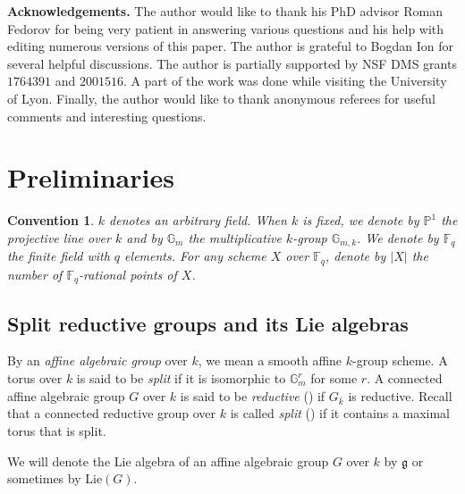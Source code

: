 \documentclass{amsart}
\newcommand{\gm}{\mathbb{G}_{m}}
\theoremstyle{plain}
\newtheorem{convention}{Convention}[section]
\theoremstyle{definition}
\theoremstyle{remark}
\begin{document}
\hspace*{-5.5mm}
\textbf{Acknowledgements.} 
The author would like to thank his PhD advisor Roman Fedorov for being very patient in answering various questions and his help with editing numerous versions of this paper. 
The author is grateful to Bogdan Ion for several helpful discussions. 
The author is partially supported by NSF DMS grants $1764391$ and
$2001516$. A part of the work was done while visiting the University of Lyon. Finally, the author would like to thank anonymous referees for useful comments and interesting questions.
\section{Preliminaries}\label{section2}

\begin{convention}
$k$ denotes an arbitrary field. When $k$ is fixed, we denote by $\mathbb{P}^{1}$ the projective line over $k$ and by $\gm$ the multiplicative $k$-group $\mathbb{G}_{m,k}$. We denote by $\mathbb{F}_{q}$ the finite field with $q$ elements. For any scheme $X$ over $\mathbb{F}_{q}$, denote by $|X|$ the number of $\mathbb{F}_{q}$-rational points of $X$. 
\end{convention}
\subsection{Split reductive groups and its Lie algebras}
By an \emph{affine algebraic group} over $k$, we mean a smooth affine $k$-group scheme. A torus over $k$ is said to be \emph{split} if it is isomorphic to $\mathbb{G}^{r}_{m}$ for some $r$. A connected affine algebraic group $G$ over $k$ is said to be \emph{reductive} (\cite[Section 6.46]{Mil1}) if $G_{\overline{k}}$ is reductive.
Recall that a connected reductive group over $k$ is called \emph{split} (\cite[Definition 19.22]{Mil1}) if it contains a maximal torus that is split.

We will denote the Lie algebra of an affine algebraic group $G$ over $k$ by $\mathfrak{g}$ or sometimes by Lie$(G)$. 
\end{document}
